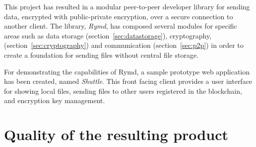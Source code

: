 This project has resulted in a modular peer-to-peer developer library for sending data, encrypted with public-private encryption, over a secure connection to another client. The library, \emph{Rymd}, has composed several modules for specific areas such as data storage (section~\ref{sec:datastorage}), cryptography, (section~\ref{sec:cryptography}) and communication (section~\ref{sec:p2p}) in order to create a foundation for sending files without central file storage.

For demonstrating the capabilities of Rymd, a sample prototype web application has been created, named \emph{Shuttle}. This front facing client provides a user interface for showing local files, sending files to other users registered in the blockchain, and encryption key management.

\section{Quality of the resulting product}

